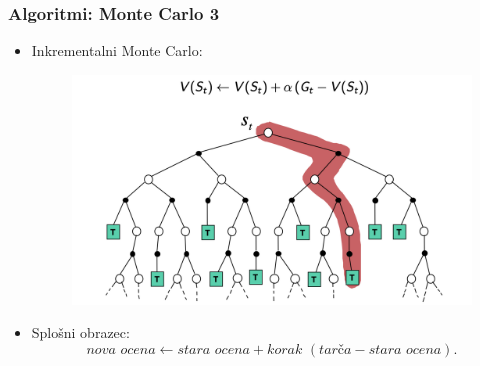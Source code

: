 \documentclass{beamer}    %
\begin{document}
\begin{frame}
    \frametitle{Algoritmi: Monte Carlo 3}
    \begin{itemize}
        \item Inkrementalni Monte Carlo:
                \begin{figure}[b]
                    \includegraphics[scale=0.45]{slike/backup-mc.png}
                \end{figure}
        \item Splošni obrazec: 
                $$
                \textit{nova ocena} \leftarrow \textit{stara ocena} + \textit{korak } 
                (\textit{tarča} - \textit{stara ocena}).
                $$
    \end{itemize}
\end{frame}
\end{document}
